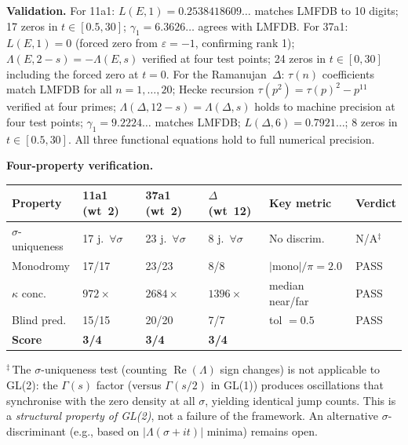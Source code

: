 \documentclass[11pt, a4paper]{article}
\theoremstyle{definition}
\theoremstyle{plain}
\begin{document}
\medskip\noindent
\textbf{Validation.}
For 11a1: $L(E,1) = 0.2538418609\ldots$ matches LMFDB to 10 digits;
17 zeros in $t \in [0.5, 30]$; $\gamma_1 = 6.3626\ldots$ agrees with LMFDB.
For 37a1: $L(E,1) = 0$ (forced zero from $\varepsilon = -1$, confirming rank 1);
$\Lambda(E,2{-}s) = -\Lambda(E,s)$ verified at four test points;
24 zeros in $t \in [0, 30]$ including the forced zero at $t = 0$.
For the Ramanujan~$\Delta$: $\tau(n)$ coefficients match LMFDB for all
$n = 1, \ldots, 20$; Hecke recursion $\tau(p^2) = \tau(p)^2 - p^{11}$
verified at four primes; $\Lambda(\Delta, 12{-}s) = \Lambda(\Delta, s)$
holds to machine precision at four test points;
$\gamma_1 = 9.2224\ldots$ matches LMFDB; $L(\Delta, 6) = 0.7921\ldots$;
8 zeros in $t \in [0.5, 30]$.
All three functional equations hold to full numerical precision.

\medskip\noindent
\textbf{Four-property verification.}

\begin{center}
\small
\begin{tabular}{llllll}
\toprule
Property & 11a1 (wt~2) & 37a1 (wt~2) & $\Delta$ (wt~12) & Key metric & Verdict \\
\midrule
$\sigma$-uniqueness & 17 j.\ $\forall\sigma$ & 23 j.\ $\forall\sigma$ & 8 j.\ $\forall\sigma$ & No discrim. & N/A$^\ddagger$ \\
Monodromy & 17/17 & 23/23 & 8/8 & $|\text{mono}|/\pi = 2.0$ & PASS \\
$\kappa$ conc. & $972\times$ & $2684\times$ & $1396\times$ & median near/far & PASS \\
Blind pred. & 15/15 & 20/20 & 7/7 & tol $= 0.5$ & PASS \\
\midrule
\textbf{Score} & \textbf{3/4} & \textbf{3/4} & \textbf{3/4} & & \\
\bottomrule
\end{tabular}
\end{center}

\noindent
$^\ddagger$\,The $\sigma$-uniqueness test (counting $\operatorname{Re}(\Lambda)$
sign changes) is not applicable to GL(2): the $\Gamma(s)$ factor (versus
$\Gamma(s/2)$ in GL(1)) produces oscillations that synchronise with
the zero density at all $\sigma$, yielding identical jump counts.
This is a \emph{structural property of GL(2)}, not a failure of the
framework.  An alternative $\sigma$-discriminant (e.g., based on
$|\Lambda(\sigma + it)|$ minima) remains open.
\end{document}
